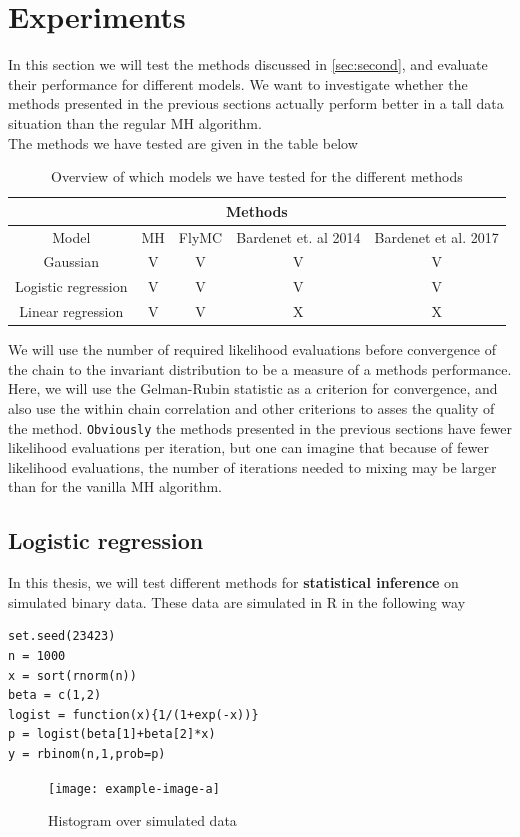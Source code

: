 \chapter{Experiments}\label{chap:experiments}
In this section we will test the methods discussed in \ref{sec:second}, and evaluate their performance for different models. We want to investigate whether the methods presented in the previous sections actually perform better in a tall data situation than the regular MH algorithm.  \\
The methods we have tested are given in the table below 

\begin{table}[H]
    \centering
        \begin{tabular}{|c|c|c|c|c|}
    \hline
    \multicolumn{5}{|c|}{Methods} \\
    \hline
   Model & MH & FlyMC & Bardenet et. al 2014 & Bardenet et al. 2017\\ \hline\hline
        Gaussian & V & V & V &V \\
        Logistic regression &V &V &V &V  \\
        Linear regression &V & V& X& X \\ \hline
    \end{tabular}{}
    \caption{Overview of which models we have tested for the different methods}
    \label{tab:experiment_overview}
\end{table}{}
We will use the number of required likelihood evaluations before convergence of the chain to the invariant distribution to be a measure of a methods performance.
Here, we will use the Gelman-Rubin statistic as a criterion for convergence, and also use the within chain correlation and other criterions to asses the quality of the method. 
\texttt{Obviously} the methods presented in the previous sections have fewer likelihood evaluations per iteration, but one can imagine that because of fewer likelihood evaluations, the number of iterations needed to mixing may be larger than for the vanilla MH algorithm. 


\section{Logistic regression}\label{subsec:data}
In this thesis, we will test different methods for \textbf{statistical inference} on simulated binary data. These data are simulated in R in the following way
\begin{lstlisting}[caption={simulation of binary data}, label={lst:simulation}]
set.seed(23423)
n = 1000
x = sort(rnorm(n))
beta = c(1,2)
logist = function(x){1/(1+exp(-x))}
p = logist(beta[1]+beta[2]*x)
y = rbinom(n,1,prob=p)
\end{lstlisting}
\begin{figure}
    \centering
    \texttt{[image: example-image-a]}
    \caption{Histogram over simulated data}
    \label{fig:my_label}
\end{figure}{}

